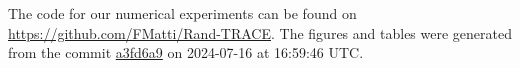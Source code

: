 The code for our numerical experiments can be found on \url{https://github.com/FMatti/Rand-TRACE}. The figures and tables were generated from the commit \href{https://github.com/FMatti/Rand-TRACE/tree/a3fd6a9}{a3fd6a9} on 2024-07-16 at 16:59:46 UTC.
